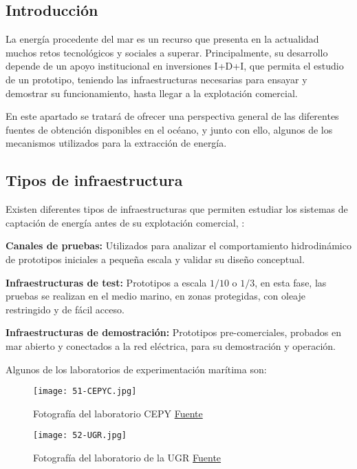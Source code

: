 \subsection{Introducción}\label{header-n3}

La energía procedente del mar es un recurso que presenta en la
actualidad muchos retos tecnológicos y sociales a superar.
Principalmente, su desarrollo depende de un apoyo institucional en
inversiones I+D+I, que permita el estudio de un prototipo, teniendo las
infraestructuras necesarias para ensayar y demostrar su funcionamiento,
hasta llegar a la explotación comercial.

En este apartado se tratará de ofrecer una perspectiva general de las
diferentes fuentes de obtención disponibles en el océano, y junto con
ello, algunos de los mecanismos utilizados para la extracción de
energía.

\subsection{Tipos de infraestructura}\label{header-n8}

Existen diferentes tipos de infraestructuras que permiten estudiar los sistemas de captación de
energía antes de su explotación comercial, \cite{ibanez08}:

\textbf{Canales de pruebas:} Utilizados para analizar el comportamiento
hidrodinámico de prototipos iniciales a pequeña escala y validar su
diseño conceptual.

\textbf{Infraestructuras de test:} Prototipos a escala $1/10$ o $1/3$, en
esta fase, las pruebas se realizan en el medio marino, en zonas
protegidas, con oleaje restringido y de fácil acceso.

\textbf{Infraestructuras de demostración:} Prototipos pre-comerciales,
probados en mar abierto y conectados a la red eléctrica, para su
demostración y operación.

Algunos de los laboratorios de experimentación marítima son:

\begin{figure}[hb]
\centering
\texttt{[image: 51-CEPYC.jpg]}
\caption[Laboratorio CEPY]{Fotografía del laboratorio CEPY \href{http://www.cedex.es/CEDEX/LANG_CASTELLANO/ORGANISMO/CENTYLAB/CEPYC/EQUIPAMIENTO/LEM0.htm}{Fuente}}
\label{fig:CEYPY}
\end{figure}

\begin{figure}[hb]
\centering
\texttt{[image: 52-UGR.jpg]}
\caption[Laboratorio de la UGR]{Fotografía del laboratorio de la UGR \href{http://doctorados.ugr.es/dinamicaambiental/pages/investigacion/recursos_instalaciones}{Fuente}}
\label{fig:UGR}
\end{figure}

